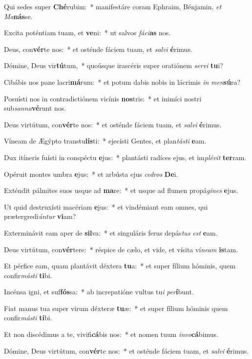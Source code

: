 \item Qui sedes super \textbf{Ché}rubim:~* manifestáre coram Ephraim, Bénjamin, \textit{et} \textit{Ma}\textbf{nás}se.
\item Excita poténtiam tuam, et \textbf{ve}ni:~* ut salvos \textit{fá}\textit{ci}\textbf{as} nos.
\item Deus, con\textbf{vér}te nos:~* et osténde fáciem tuam, et \textit{sal}\textit{vi} \textbf{é}rimus.
\item Dómine, Deus vir\textbf{tú}tum,~* quoúsque irascéris super oratiónem \textit{ser}\textit{vi} \textbf{tu}i?
\item Cibábis nos pane lacri\textbf{má}rum:~* et potum dabis nobis in lácrimis \textit{in} \textit{men}\textbf{sú}ra?
\item Posuísti nos in contradictiónem vicínis \textbf{nos}tris:~* et inimíci nostri sub\textit{san}\textit{na}\textbf{vé}runt nos.
\item Deus virtútum, con\textbf{vér}te nos:~* et osténde fáciem tuam, et \textit{sal}\textit{vi} \textbf{é}rimus.
\item Víneam de Ægýpto transtu\textbf{lís}ti:~* ejecísti Gentes, et plan\textit{tás}\textit{ti} \textbf{e}am.
\item Dux itíneris fuísti in conspéctu \textbf{e}jus:~* plantásti radíces ejus, et im\textit{plé}\textit{vit} \textbf{ter}ram.
\item Opéruit montes umbra \textbf{e}jus:~* et arbústa ejus \textit{ce}\textit{dros} \textbf{De}i.
\item Exténdit pálmites suos usque ad \textbf{ma}re:~* et usque ad flumen propá\textit{gi}\textit{nes} \textbf{e}jus.
\item Ut quid destruxísti macériam \textbf{e}jus:~* et vindémiant eam omnes, qui prætergredi\textit{ún}\textit{tur} \textbf{vi}am?
\item Exterminávit eam aper de \textbf{sil}va:~* et singuláris ferus depás\textit{tus} \textit{est} \textbf{e}am.
\item Deus virtútum, con\textbf{vér}tere:~* réspice de cælo, et vide, et vísita ví\textit{ne}\textit{am} \textbf{is}tam.
\item Et pérfice eam, quam plantávit déxtera \textbf{tu}a:~* et super fílium hóminis, quem confir\textit{más}\textit{ti} \textbf{ti}bi.
\item Incénsa igni, et suf\textbf{fós}sa:~* ab increpatióne vultus tu\textit{i} \textit{per}\textbf{í}bunt.
\item Fiat manus tua super virum déxteræ \textbf{tu}æ:~* et super fílium hóminis quem confir\textit{más}\textit{ti} \textbf{ti}bi.
\item Et non discédimus a te, vivifi\textbf{cá}bis nos:~* et nomen tuum \textit{in}\textit{vo}\textbf{cá}bimus.
\item Dómine, Deus virtútum, con\textbf{vér}te nos:~* et osténde fáciem tuam, et \textit{sal}\textit{vi} \textbf{é}rimus.
